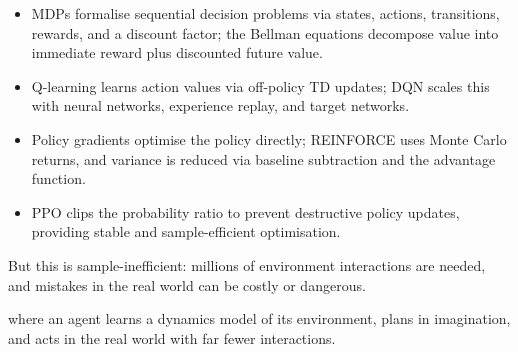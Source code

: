 \vspace{1.5em}


\begin{itemize}
    \item MDPs formalise sequential decision problems via states, actions, transitions, rewards, and a discount factor; the Bellman equations decompose value into immediate reward plus discounted future value.
    \item Q-learning learns action values via off-policy TD updates; DQN scales this with neural networks, experience replay, and target networks.
    \item Policy gradients optimise the policy directly; REINFORCE uses Monte Carlo returns, and variance is reduced via baseline subtraction and the advantage function.
    \item PPO clips the probability ratio to prevent destructive policy updates, providing stable and sample-efficient optimisation.
\end{itemize}

\vspace{2.5em}


 But this is sample-inefficient: millions of environment interactions are needed, and mistakes in the real world can be costly or dangerous.

 where an agent learns a dynamics model of its environment, plans in imagination, and acts in the real world with far fewer interactions.

